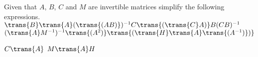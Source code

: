 

\begin{Exercise}[
name={},
title={}, 
difficulty=0,
origin={\cite{YL}}]
Given that $A$, $B$, $C$ and $M$  are invertible matrices simplify the following expressions.
\Question $\trans{B}\trans{A}(\trans{(AB)})^{-1}C\trans{(\trans{C}A)}B(CB)^{-1}$
\Question $(\trans{A}M^{-1})^{-1}\trans{(A^2)}\trans{(\trans{H}\trans{A}\trans{(A^{-1})})}$ 
\end{Exercise}

\begin{Answer}
\Question $C\trans{A}$
\Question $M\trans{A}H$
\end{Answer}
